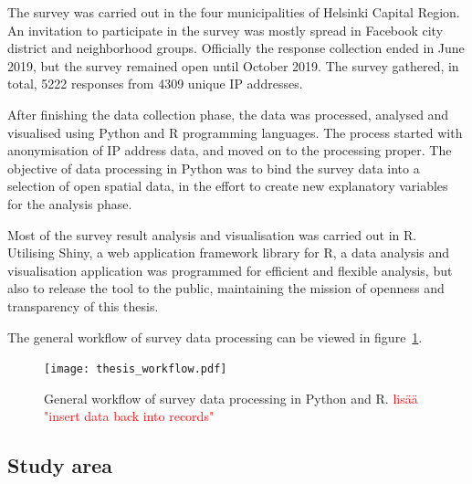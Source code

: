The survey was carried out in the four municipalities of Helsinki Capital Region. An invitation to participate in the survey was mostly spread in Facebook city district and neighborhood groups. Officially the response collection ended in June 2019, but the survey remained open until October 2019. The survey gathered, in total, 5222 responses from 4309 unique IP addresses.

After finishing the data collection phase, the data was processed, analysed and visualised using Python and R programming languages. The process started with anonymisation of IP address data, and moved on to the processing proper. The objective of data processing in Python was to bind the survey data into a selection of open spatial data, in the effort to create new explanatory variables for the analysis phase.

Most of the survey result analysis and visualisation was carried out in R. Utilising Shiny, a web application framework library for R, a data analysis and visualisation application was programmed for efficient and flexible analysis, but also to release the tool to the public, maintaining the mission of openness and transparency of this thesis.

The general workflow of survey data processing can be viewed in figure~\ref{fig:gen_workflow}.

\begin{figure}[H]
    \centering
    \texttt{[image: thesis\_workflow.pdf]}
    \caption{General workflow of survey data processing in Python and R. \textcolor{red}{lisää "insert data back into records"}} 
    \label{fig:gen_workflow}
\end{figure}
\pagebreak

\subsection{Study area}
\justify

